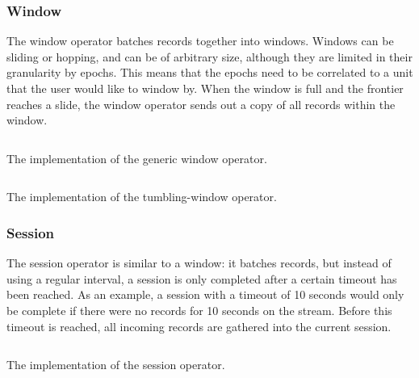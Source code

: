 \subsubsection{Window}
The window operator batches records together into windows. Windows can be sliding or hopping, and can be of arbitrary size, although they are limited in their granularity by epochs. This means that the epochs need to be correlated to a unit that the user would like to window by. When the window is full and the frontier reaches a slide, the window operator sends out a copy of all records within the window.

\begin{listing}[H]
  \inputminted[firstline=17,lastline=62]{rust}{benchmarks/src/operators/window.rs}
  \caption{The implementation of the generic window operator.}
  \label{lst:epoch-window}
\end{listing}

\begin{listing}[H]
  \inputminted[firstline=64,lastline=83]{rust}{benchmarks/src/operators/window.rs}
  \caption{The implementation of the tumbling-window operator.}
  \label{lst:tumbling-window}
\end{listing}

\subsubsection{Session}
The session operator is similar to a window: it batches records, but instead of using a regular interval, a session is only completed after a certain timeout has been reached. As an example, a session with a timeout of 10 seconds would only be complete if there were no records for 10 seconds on the stream. Before this timeout is reached, all incoming records are gathered into the current session.

\begin{listing}[H]
  \inputminted[firstline=47,lastline=100]{rust}{benchmarks/src/operators/session.rs}
  \caption{The implementation of the session operator.}
  \label{lst:session}
\end{listing}

